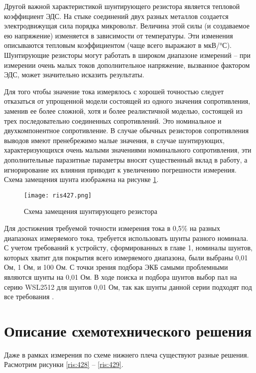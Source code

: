 Другой важной характеристикой шунтирующего резистора является тепловой коэффициент ЭДС. На стыке 
соединений двух разных металлов создается электродвижущая сила порядка микровольт. Величина этой 
силы (и создаваемое ею напряжение) изменяется в зависимости от температуры. Эти изменения описываются 
тепловым коэффициентом (чаще всего выражают в мкВ/°С). Шунтирующие резисторы могут работать в широком 
диапазоне измерений -- при измерении очень малых токов дополнительное напряжение, вызванное фактором 
ЭДС, может значительно исказить результаты.

Для того чтобы значение тока измерялось с хорошей точностью следует отказаться от упрощенной модели 
состоящей из одного значения сопротивления, заменив ее более сложной, хотя и более реалистичной моделью, 
состоящей из трех последовательно соединенных сопротивлений. Это номинальное и двухкомпонентное 
сопротивление. В случае обычных резисторов сопротивления выводов имеют пренебрежимо малые значения, 
в случае шунтирующих, характеризующихся очень малыми значениями номинального сопротивления, 
эти дополнительные паразитные параметры вносят существенный вклад в работу, а игнорирование их 
влияния приводит к увеличению погрешности измерения. Схема замещения шунта изображена на рисунке 
\ref{ris:427}.

\begin{figure}[H]
\centering
\texttt{[image: ris427.png]}
\caption{Схема замещения шунтирующего резистора}
\label{ris:427}
\end{figure}

Для достижения требуемой точности измерения тока в 0,5\% на разных диапазонах измеряемого тока, 
требуется использовать шунты разного номинала. С учетом требований к устройсту, сформированных в главе 1,
номиналы шунтов, которых хватит для покрытия всего измеряемого диапазона, были выбраны 
0,01 Ом, 1 Ом, и 100 Ом. С точки зрения подбора ЭКБ самыми проблемными являются шунты на 0,01 Ом. 
В ходе поиска и подбора шунтов выбор пал на серию WSL2512 для шунтов 0,01 Ом, так как шунты данной серии
подходят под все требования \cite{GooglePatent:1}. 

\section{Описание схемотехнического решения}
\hspace{1cm}

Даже в рамках измерения по схеме нижнего плеча существуют разные решения. Расмотрим рисунки \ref{ris:428} --
\ref{ris:429}.

